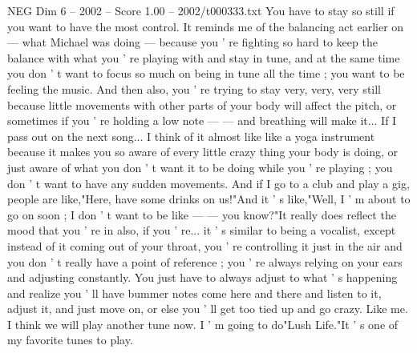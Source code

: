 \begin{textsample}{NEG Dim 6 – 2002 – Score 1.00 – 2002/t000333.txt}
You have to stay so still if you want to have the most control.
It reminds me of the balancing act earlier on — what Michael was doing — because you ' re fighting so hard to keep the balance with what you ' re playing with and stay in tune, and at the same time you don ' t want to focus so much on being in tune all the time ; you want to be feeling the music.
And then also, you ' re trying to stay very, very, very still because little movements with other parts of your body will affect the pitch, or sometimes if you ' re holding a low note — — and breathing will make it...
If I pass out on the next song...
I think of it almost like like a yoga instrument because it makes you so aware of every little crazy thing your body is doing, or just aware of what you don ' t want it to be doing while you ' re playing ; you don ' t want to have any sudden movements.
And if I go to a club and play a gig, people are like,"Here, have some drinks on us!"And it ' s like,"Well, I ' m about to go on soon ; I don ' t want to be like — — you know?"It really does reflect the mood that you ' re in also, if you ' re... it ' s similar to being a vocalist, except instead of it coming out of your throat, you ' re controlling it just in the air and you don ' t really have a point of reference ; you ' re always relying on your ears and adjusting constantly.
You just have to always adjust to what ' s happening and realize you ' ll have bummer notes come here and there and listen to it, adjust it, and just move on, or else you ' ll get too tied up and go crazy.
Like me.
I think we will play another tune now.
I ' m going to do"Lush Life."It ' s one of my favorite tunes to play.

\end{textsample}
